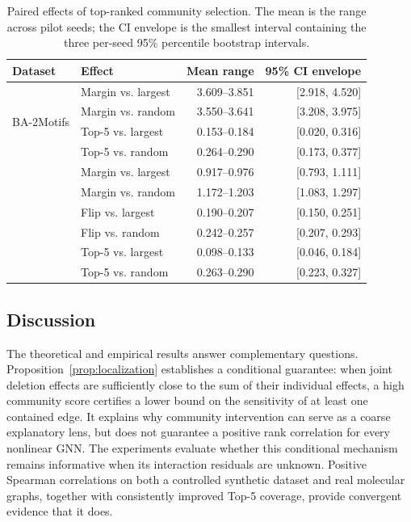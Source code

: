 \documentclass[runningheads]{llncs}
\begin{document}
\begin{table}[t]
\centering
\caption{Paired effects of top-ranked community selection. The mean is the
range across pilot seeds; the CI envelope is the smallest interval containing
the three per-seed 95\% percentile bootstrap intervals.}
\label{tab:pilot-bootstrap}
\small
\begin{tabular}{llrr}
\toprule
Dataset & Effect & Mean range & 95\% CI envelope \\
\midrule
\multirow{4}{*}{BA-2Motifs}
 & Margin vs. largest & 3.609--3.851 & [2.918, 4.520] \\
 & Margin vs. random & 3.550--3.641 & [3.208, 3.975] \\
 & Top-5 vs. largest & 0.153--0.184 & [0.020, 0.316] \\
 & Top-5 vs. random & 0.264--0.290 & [0.173, 0.377] \\
\addlinespace
\multirow{6}{*}{Mutagenicity}
 & Margin vs. largest & 0.917--0.976 & [0.793, 1.111] \\
 & Margin vs. random & 1.172--1.203 & [1.083, 1.297] \\
 & Flip vs. largest & 0.190--0.207 & [0.150, 0.251] \\
 & Flip vs. random & 0.242--0.257 & [0.207, 0.293] \\
 & Top-5 vs. largest & 0.098--0.133 & [0.046, 0.184] \\
 & Top-5 vs. random & 0.263--0.290 & [0.223, 0.327] \\
\bottomrule
\end{tabular}
\end{table}

\subsection{Discussion}
The theoretical and empirical results answer complementary questions.
Proposition~\ref{prop:localization} establishes a conditional guarantee: when
joint deletion effects are sufficiently close to the sum of their individual
effects, a high community score certifies a lower bound on the sensitivity of
at least one contained edge. It explains why community intervention can serve
as a coarse explanatory lens, but does not guarantee a positive rank
correlation for every nonlinear GNN. The experiments evaluate whether this
conditional mechanism remains informative when its interaction residuals are
unknown. Positive Spearman correlations on both a controlled synthetic
dataset and real molecular graphs, together with consistently improved Top-5
coverage, provide convergent evidence that it does.
\end{document}
